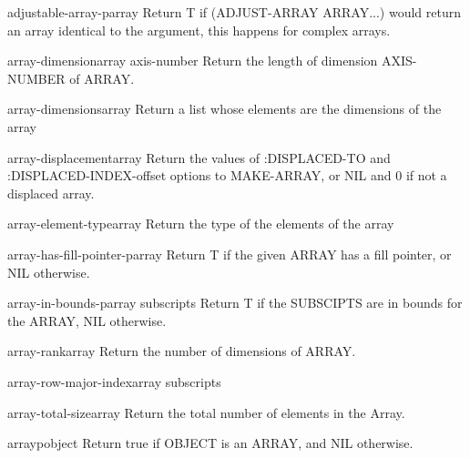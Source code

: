 \begin{function}{adjustable-array-p}{array}{}{}
  Return T if (ADJUST-ARRAY ARRAY...) would return an array identical
   to the argument, this happens for complex arrays.
\end{function}

\begin{function}{array-dimension}{array axis-number}{}{}
  Return the length of dimension AXIS-NUMBER of ARRAY.
\end{function}

\begin{function}{array-dimensions}{array}{}{}
  Return a list whose elements are the dimensions of the array
\end{function}

\begin{function}{array-displacement}{array}{}{}
  Return the values of :DISPLACED-TO and :DISPLACED-INDEX-offset
   options to MAKE-ARRAY, or NIL and 0 if not a displaced array.
\end{function}

\begin{function}{array-element-type}{array}{}{}
  Return the type of the elements of the array
\end{function}

\begin{function}{array-has-fill-pointer-p}{array}{}{}
  Return T if the given ARRAY has a fill pointer, or NIL otherwise.
\end{function}

\begin{function}{array-in-bounds-p}{array \rest subscripts}{}{}
  Return T if the SUBSCIPTS are in bounds for the ARRAY, NIL otherwise.
\end{function}

\begin{function}{array-rank}{array}{}{}
  Return the number of dimensions of ARRAY.
\end{function}

\begin{function}{array-row-major-index}{array \rest subscripts}{}{}
  
\end{function}

\begin{function}{array-total-size}{array}{}{}
  Return the total number of elements in the Array.
\end{function}

\begin{function}{arrayp}{object}{}{}
  Return true if OBJECT is an ARRAY, and NIL otherwise.
\end{function}

